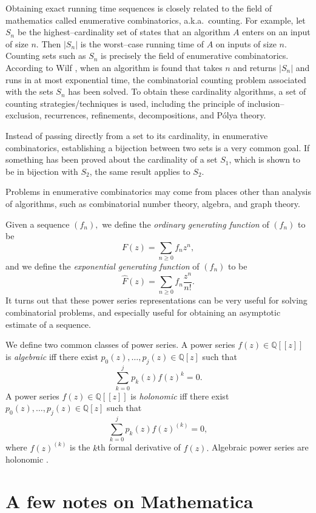 \documentclass{article}
\theoremstyle{plain}
\begin{document}
Obtaining exact running time sequences is closely related to the field of
mathematics called enumerative combinatorics, a.k.a.\ counting.
For example, let \(S_n\) be the highest--cardinality set of states that an
algorithm \(A\) enters on an input of size \(n\).
Then \( |S_n| \) is the worst--case running time of \( A \) on inputs of size
\( n \).
Counting sets such as \(S_n\) is precisely the field of enumerative
combinatorics.
According to Wilf \cite{wilf}, when an algorithm is found that takes
\( n \) and returns \( |S_n| \) and runs in at
most exponential time, the combinatorial counting problem associated with
the sets \( S_n \) has been solved.
To obtain these cardinality algorithms, a set of counting
strategies/techniques is used, including the principle of inclusion--exclusion,
recurrences, refinements, decompositions, and P\'olya theory.

Instead of passing directly from a set to its cardinality, in enumerative
combinatorics, establishing a bijection between two sets is a very common
goal.
If something has been proved about the cardinality of a set \( S_1 \), which
is shown to be in bijection with \(S_2\), the same result applies to \(S_2\).

Problems in enumerative combinatorics may come from places
other than analysis of algorithms, such as combinatorial number theory,
algebra, and graph theory.

Given a sequence \( (f_n), \) we define the \emph{ordinary generating function}
of \( (f_n) \) to be
\[
  F(z) = \sum_{n \geq 0} f_n z^n,
\]
and we define the \emph{exponential generating function} of \( (f_n) \) to be
\[
  \hat{F}(z) = \sum_{n \geq 0} f_n \frac{z^n}{n!}.
\]
It turns out that these power series representations can be very useful for
solving combinatorial problems, and especially useful for obtaining an
asymptotic estimate of a sequence.

We define two common classes of power series.
A power series \( f(z) \in \mathbb{Q}[[z]] \) is \emph{algebraic} iff there
exist \( p_0(z), \dots, p_j(z) \in \mathbb{Q}[z] \) such that
\[
  \sum_{k=0}^j p_k(z) f(z)^k = 0.
\]
A power series \( f(z) \in \mathbb{Q}[[z]] \) is \emph{holonomic} iff there
exist \( p_0(z), \dots, p_j(z) \in \mathbb{Q}[z] \) such that
\[
  \sum_{k=0}^j p_k(z) f(z)^{(k)} = 0,
\]
where \( f(z)^{(k)} \) is the \(k\)th formal derivative of \( f(z). \)
Algebraic power series are holonomic \cite{ec2}.





\section{A few notes on Mathematica} \label{sec:mma}
\end{document}
